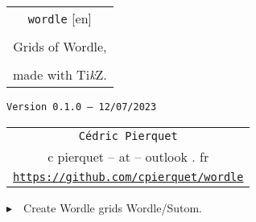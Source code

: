 \documentclass[english,a4paper,11pt]{article}
\def\TPversion{0.1.0}
\def\TPdate{12/07/2023}
\begin{document}
\setlength{\aweboxleftmargin}{0.07\linewidth}
\setlength{\aweboxcontentwidth}{0.93\linewidth}
\setlength{\aweboxvskip}{8pt}

\pagestyle{fancy}

\thispagestyle{empty}

\vspace{2cm}

\begin{center}
	\begin{minipage}{0.75\linewidth}
	\begin{tcolorbox}[colframe=yellow,colback=yellow!15]
		\begin{center}
			\begin{tabular}{c}
				{\Huge \texttt{wordle} [en]}\\
				\\
				{\LARGE Grids of Wordle,} \\
				\\
				{\LARGE made with \textsf{Ti\textit{k}Z}.} \\
			\end{tabular}
			
			\bigskip
			
			{\small \texttt{Version \TPversion{} -- \TPdate}}
		\end{center}
	\end{tcolorbox}
\end{minipage}
\end{center}

\begin{center}
	\begin{tabular}{c}
	\texttt{Cédric Pierquet}\\
	{\ttfamily c pierquet -- at -- outlook . fr}\\
	\texttt{\url{https://github.com/cpierquet/wordle}}
\end{tabular}
\end{center}

\vspace{0.25cm}

{$\blacktriangleright$~~Create Wordle grids Wordle/Sutom\footnotemark{}.}

\vspace{0.25cm}
\end{document}
